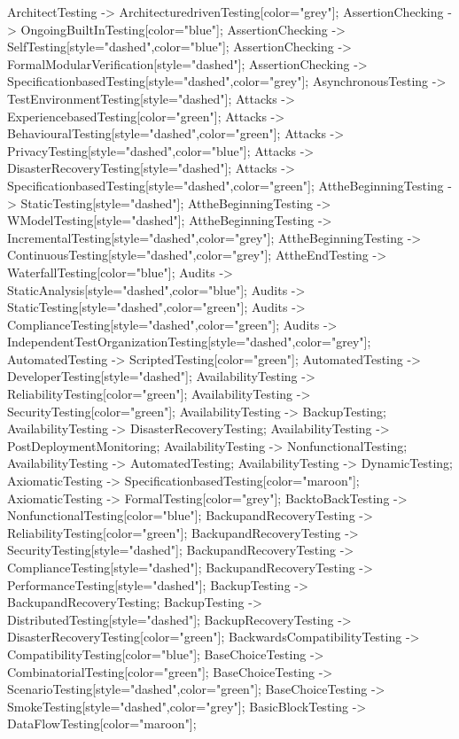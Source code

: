 \documentclass{article}
\begin{document}
{ArchitectTesting -> ArchitecturedrivenTesting[color="grey"];
AssertionChecking -> OngoingBuiltInTesting[color="blue"];
AssertionChecking -> SelfTesting[style="dashed",color="blue"];
AssertionChecking -> FormalModularVerification[style="dashed"];
AssertionChecking -> SpecificationbasedTesting[style="dashed",color="grey"];
AsynchronousTesting -> TestEnvironmentTesting[style="dashed"];
Attacks -> ExperiencebasedTesting[color="green"];
Attacks -> BehaviouralTesting[style="dashed",color="green"];
Attacks -> PrivacyTesting[style="dashed",color="blue"];
Attacks -> DisasterRecoveryTesting[style="dashed"];
Attacks -> SpecificationbasedTesting[style="dashed",color="green"];
AttheBeginningTesting -> StaticTesting[style="dashed"];
AttheBeginningTesting -> WModelTesting[style="dashed"];
AttheBeginningTesting -> IncrementalTesting[style="dashed",color="grey"];
AttheBeginningTesting -> ContinuousTesting[style="dashed",color="grey"];
AttheEndTesting -> WaterfallTesting[color="blue"];
Audits -> StaticAnalysis[style="dashed",color="blue"];
Audits -> StaticTesting[style="dashed",color="green"];
Audits -> ComplianceTesting[style="dashed",color="green"];
Audits -> IndependentTestOrganizationTesting[style="dashed",color="grey"];
AutomatedTesting -> ScriptedTesting[color="green"];
AutomatedTesting -> DeveloperTesting[style="dashed"];
AvailabilityTesting -> ReliabilityTesting[color="green"];
AvailabilityTesting -> SecurityTesting[color="green"];
AvailabilityTesting -> BackupTesting;
AvailabilityTesting -> DisasterRecoveryTesting;
AvailabilityTesting -> PostDeploymentMonitoring;
AvailabilityTesting -> NonfunctionalTesting;
AvailabilityTesting -> AutomatedTesting;
AvailabilityTesting -> DynamicTesting;
AxiomaticTesting -> SpecificationbasedTesting[color="maroon"];
AxiomaticTesting -> FormalTesting[color="grey"];
BacktoBackTesting -> NonfunctionalTesting[color="blue"];
BackupandRecoveryTesting -> ReliabilityTesting[color="green"];
BackupandRecoveryTesting -> SecurityTesting[style="dashed"];
BackupandRecoveryTesting -> ComplianceTesting[style="dashed"];
BackupandRecoveryTesting -> PerformanceTesting[style="dashed"];
BackupTesting -> BackupandRecoveryTesting;
BackupTesting -> DistributedTesting[style="dashed"];
BackupRecoveryTesting -> DisasterRecoveryTesting[color="green"];
BackwardsCompatibilityTesting -> CompatibilityTesting[color="blue"];
BaseChoiceTesting -> CombinatorialTesting[color="green"];
BaseChoiceTesting -> ScenarioTesting[style="dashed",color="green"];
BaseChoiceTesting -> SmokeTesting[style="dashed",color="grey"];
BasicBlockTesting -> DataFlowTesting[color="maroon"];
}
\end{document}
